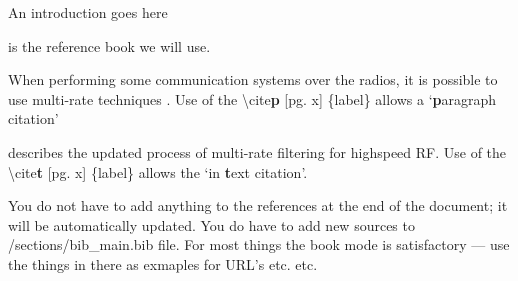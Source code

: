 
An introduction goes here
\vspace{3em}

\citet{solomon2010} is the reference book we will use.
\vspace{1em}

When performing some communication systems over the radios, it is possible to use multi-rate techniques \citep[pg. 54]{harris2004}. Use of the \textbackslash cite\textbf{p} [pg. x] \{label\} allows a `\textbf{p}aragraph citation'
\vspace{1em}

\citet{harris2021} describes the updated process of multi-rate filtering for highspeed RF. Use of the \textbackslash cite\textbf{t} [pg. x] \{label\} allows the `in \textbf{t}ext citation'.
\vspace{1em}

You do not have to add anything to the references at the end of the document; it will be automatically updated.
You do have to add new sources to /sections/bib\_main.bib file. For most things the book mode is satisfactory --- use the things in there as exmaples for URL's etc. etc. 
\clearpage

